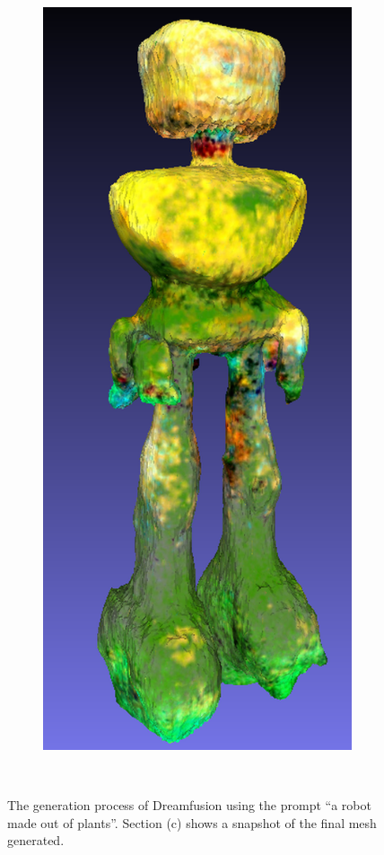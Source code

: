 \begin{figure}[H]
\begin{subfigure}[b]{0.252\textwidth}
        \includegraphics[width=\textwidth]{etc/a robot made out of plants/dreamfusion/dreamfusion_plantrobot_model_resized.png}
        \caption{}
    \end{subfigure}
    \caption{The generation process of Dreamfusion using the prompt ``a robot made out of plants''. Section (c) shows a snapshot of the final mesh generated.}~\label{fig:generationDreamFusion}
\end{figure}

